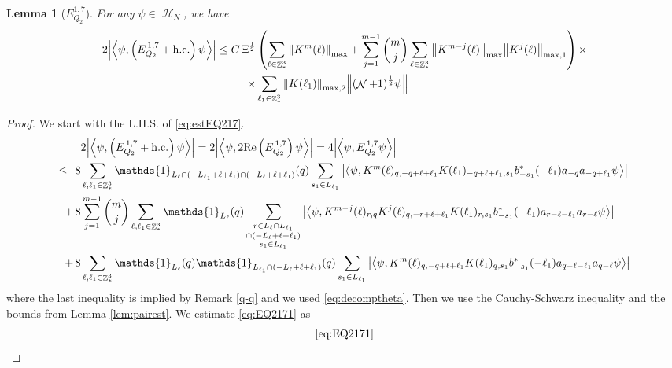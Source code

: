 \documentclass[sn-mathphys, Numbered ,a4paper]{sn-jnl}%
\DeclareMathOperator{\Z}{\mathbb{Z}}
\DeclareMathOperator{\HH}{\mathcal{H}}
\DeclareMathOperator{\NN}{\mathcal{N}}
\newcommand{\half}{\frac{1}{2}}
\newcommand{\eva}[1]{\left\langle #1 \right\rangle}
\theoremstyle{plain}
\newtheorem{lemma}[theorem]{Lemma}
\theoremstyle{definition}
\theoremstyle{remark}
\theoremstyle{plain}
\theoremstyle{definition}
\theoremstyle{remark}
\begin{document}
\begin{lemma}[$E_{Q_2}^{1,7}$]
	For any $\psi \in \HH_N$, we have
	\begin{align}
		2\abs{\eva{\psi,\left(E^{\,1,7}_{Q_2}+\mathrm{h.c.}\right) \psi }}
		\leq  C\,  \Xi^\half &\left(\sum\limits_{\ell \in \Z^3_*} \norm{K^m(\ell)}_{\mathrm{max}} +\sum\limits_{j=1}^{m-1} {{m}\choose j} \sum\limits_{\ell \in \Z^3_*} \norm{K^{m-j}(\ell)}_{\mathrm{max}}  \norm{ K^{j}(\ell)}_{\mathrm{max},1} \right)\nonumber \times\\ \times& \sum\limits_{\ell_1\in \Z^3_*} \norm{ K(\ell_1)}_{\mathrm{max,2}} \norm{(\NN+1)^\half\psi}  \label{eq:estEQ217}
	\end{align}
\end{lemma}
\begin{proof}
 We start with the L.H.S. of \eqref{eq:estEQ217}.
\begin{align}
	&2\abs{\eva{\psi,\left(E^{\,1,7}_{Q_2}+\mathrm{h.c.}\right) \psi }} =2 \abs{\eva{\psi,2\mathrm{Re}\left(E^{\,1,7}_{Q_2}\right) \psi }} = 4\abs{\eva{\psi, E^{\,1,7}_{Q_2} \psi }}\nonumber\\
	\leq\,\;8& \sum\limits_{\ell, \ell_1\in \Z^3_*} \mathds{1}_{L_{\ell} \cap (-L_{\ell_1}+\ell+\ell_1) \cap (-L_{\ell}+\ell+\ell_1)}(q) \sum\limits_{s_1 \in L_{\ell_1}} \abs{\eva{\psi, K^m(\ell)_{q,-q+\ell+\ell_1} K(\ell_1)_{-q+\ell+\ell_1,s_1} b^*_{-s_1}(-\ell_1) a_{-q} a_{-q+\ell_1} \psi}} \label{eq:EQ2171}\\
	+\,8& \sum\limits_{j=1}^{m-1} {{m}\choose j} \sum\limits_{\ell, \ell_1\in \Z^3_*}\mathds{1}_{L_{\ell}}(q) \sum\limits_{\substack{r\in L_{\ell} \cap L_{\ell_1} \\ \cap (-L_{\ell}+\ell+\ell_1)\\s_1\in L_{\ell_1}}}  \abs{\eva{\psi, K^{m-j}(\ell)_{r,q} K^j(\ell)_{q,-r+\ell+\ell_1} K(\ell_1)_{r,s_1} b^*_{-s_1}(-\ell_1)a_{r-\ell-\ell_1}a_{r-\ell} \psi }} \label{eq:EQ2172}\\
	+\,8&\sum\limits_{\ell, \ell_1\in \Z^3_*} \mathds{1}_{L_{\ell}}(q) \mathds{1}_{L_{\ell_1}\cap (-L_{\ell}+\ell+\ell_1)}(q) \sum\limits_{s_1\in L_{\ell_1}} \abs{\eva{\psi, K^m(\ell)_{q,-q+\ell+\ell_1} K(\ell_1)_{q,s_1} b^*_{-s_1}(-\ell_1)a_{q-\ell-\ell_1}a_{q-\ell} \psi }} \label{eq:EQ2173}
\end{align}
where the last inequality is implied by Remark \ref{q-q} and we used \eqref{eq:decomptheta}.
Then we use the Cauchy-Schwarz inequality and the bounds from Lemma \ref{lem:pairest}.
We estimate \eqref{eq:EQ2171} as 
\begin{align}
	&\eqref{eq:EQ2171}\nonumber\\

\end{align}
\end{proof}
\end{document}
